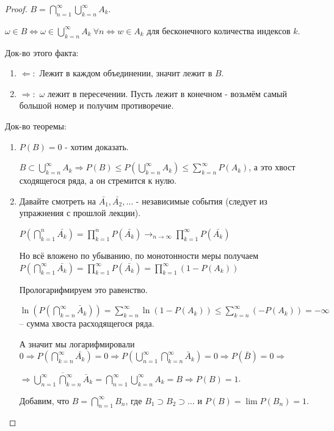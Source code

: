 \begin{proof}
    $B = \bigcap_{n = 1}^{\infty} \bigcup_{k = n}^{\infty} A_k$.

    $\omega \in B \Longleftrightarrow \omega \in \bigcup_{k = n}^{\infty} A_k \ \forall n \Longleftrightarrow w \in A_k$ для бесконечного количества индексов $k$.

    Док-во этого факта:

    \begin{enumerate}
        \item $\Leftarrow:$ Лежит в каждом объединении, значит лежит в $B$.
        \item $\Rightarrow:$ $\omega$ лежит в пересечении. Пусть лежит в конечном - возьмём самый большой номер и получим противоречие.
    \end{enumerate}

    Док-во теоремы:

    \begin{enumerate}
        \item $P(B) = 0$ - хотим доказать.
        
        $B \subset \bigcup_{k = n}^{\infty} A_k \Rightarrow P(B) \leqslant P(\bigcup_{k = n}^{\infty} A_k) \leqslant \sum_{k = n}^{\infty} P(A_k)$, 
        а это хвост сходящегося ряда, а он стремится к нулю.

        \item Давайте смотреть на $\bar{A_1}, \bar{A_2}, \ldots$ - независимые события (следует из упражнения с прошлой лекции).
        
        $P(\bigcap_{k = 1}^n \bar{A_k}) = \prod_{k = 1}^{n} P(\bar{A_k}) \to_{n \to \infty} \prod_{k = 1}^{\infty}  P(\bar{A_k})$

        Но всё вложено по убыванию, по монотонности меры получаем $P(\bigcap_{k = 1}^{\infty} \bar{A_k}) = \prod_{k = 1}^{\infty} P(\bar{A_k}) = 
        \prod_{k=1}^{\infty} (1 - P(A_k))$

        Прологарифмируем это равенство.


        $\ln (P(\bigcap_{k = n}^{\infty} \bar{A}_k)) = \sum_{k = n}^{\infty} \ln(1 - P(A_k)) \leqslant \sum_{k = n}^{\infty} (-P(A_k)) = -\infty$ -- сумма хвоста расходящегося ряда.

        А значит мы логарифмировали $0 \Rightarrow P(\bigcap_{k = n}^{\infty} \bar{A_k}) = 0 \Rightarrow P(\bigcup_{n=1}^{\infty} \bigcap_{k = n}^{\infty} \bar{A}_k) = 0 \Rightarrow P(\bar{B}) = 0 \Rightarrow$
        
        $\Rightarrow \overline{\bigcup_{n=1}^{\infty} \bigcap_{k = n}^{\infty} \bar{A}_k} = \bigcap_{n=1}^{\infty} \bigcup_{k=n}^{\infty} A_k = B \Rightarrow P(B) = 1$.

        Добавим, что $B = \bigcap_{n = 1}^{\infty} B_n$, где $B_1 \supset B_2 \supset \ldots$ и $P(B) = \lim P(B_n) = 1$.
    \end{enumerate}
\end{proof}

